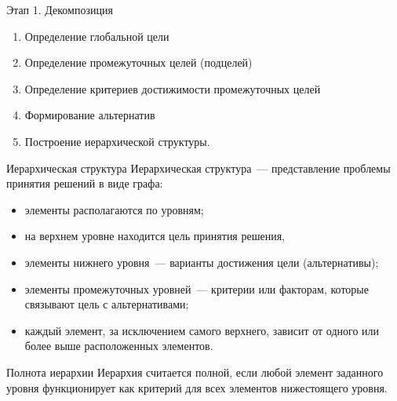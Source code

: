 \documentclass[unicode,11pt,notheorems,xcolor=table]{beamer}
\begin{document}
\begin{frame}{Этап 1. Декомпозиция}{}
    \begin{enumerate}
        \item Определение глобальной цели
        \item Определение промежуточных целей (подцелей)
        \item Определение критериев достижимости промежуточных целей 
        \item Формирование альтернатив    
        \item Построение иерархической структуры.
    \end{enumerate}
\end{frame}
\begin{frame}{Иерархическая структура}{}
    \alert{Иерархическая структура}~--- представление проблемы принятия решений в виде графа:
    \begin{itemize}
        \item элементы располагаются по уровням;
        \item на верхнем уровне находится цель принятия решения,
        \item элементы нижнего уровня~--- варианты достижения цели (альтернативы); 
        \item элементы промежуточных уровней~--- критерии или факторам, которые связывают цель с альтернативами;
        \item каждый элемент, за исключением самого верхнего, зависит от одного или более выше расположенных элементов. 
    \end{itemize}
    \begin{block}{Полнота иерархии}
        Иерархия считается \alert{полной}, если любой элемент заданного уровня функционирует как критерий для всех элементов нижестоящего уровня.
    \end{block}
\end{frame}
\end{document}
